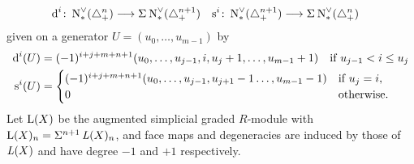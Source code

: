 \begin{align*}
	\operatorname{d}^i \colon \operatorname{N}^\vee_{*}(\triangle_{+}^n) & \longrightarrow \Sigma^{}\operatorname{N}^\vee_{*}(\triangle_{+}^{n+1})
	&
	\operatorname{s}^i \colon \operatorname{N}^\vee_{*}(\triangle_{+}^{n+1}) & \longrightarrow \Sigma^{}\operatorname{N}^\vee_{*}(\triangle_{+}^n)
\end{align*}
given on a generator $U=(u_0,\dots,u_{m-1})$ by
\begin{align*}
	\operatorname{d}^i(U) &=
	(-1)^{i+j+m+n+1}(u_0,\dots,u_{j-1},i,u_{j}+1,\dots,u_{m-1}+1)
	\quad \text{if $u_{j-1}<i \leq u_{j}$}
	\\
	\operatorname{s}^i(U) &= \begin{cases}
	(-1)^{i+j+m+n+1}(u_0,\dots,u_{j-1},u_{j+1}-1\dots,u_{m-1}-1) 	& \text{if $u_{j} = i$,}
	\\
	0 & \text{otherwise.}
	\end{cases}
\end{align*}
 Let $\operatorname{L}(X)$ be the augmented simplicial graded $R$-module with $\operatorname{L}(X)_n = \Sigma^{n+1}\operatorname{{\it L}}(X)_{n}$, and face maps and degeneracies are induced by those of $\operatorname{{\it L}}(X)$ and have degree $-1$ and $+1$ respectively.

